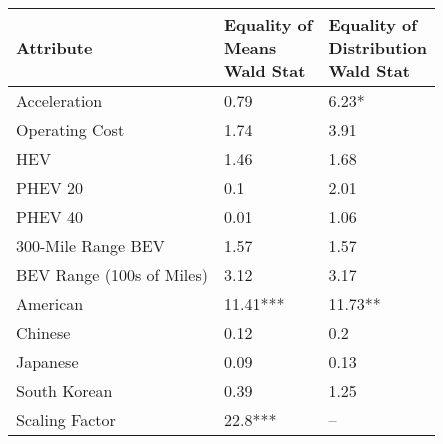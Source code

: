 \begin{tabular}{lll}
\toprule
                Attribute & \makecell{Equality of \\ Means \\ Wald Stat} & \makecell{Equality of \\ Distribution \\ Wald Stat} \\
\midrule
             Acceleration &                        \multirow{1}{*}{0.79} &                             \multirow{1}{*}{6.23*} \\
           Operating Cost &                        \multirow{1}{*}{1.74} &                              \multirow{1}{*}{3.91} \\
                      HEV &                        \multirow{1}{*}{1.46} &                              \multirow{1}{*}{1.68} \\
                  PHEV 20 &                         \multirow{1}{*}{0.1} &                              \multirow{1}{*}{2.01} \\
                  PHEV 40 &                        \multirow{1}{*}{0.01} &                              \multirow{1}{*}{1.06} \\
       300-Mile Range BEV &                        \multirow{1}{*}{1.57} &                              \multirow{1}{*}{1.57} \\
BEV Range (100s of Miles) &                        \multirow{1}{*}{3.12} &                              \multirow{1}{*}{3.17} \\
                 American &                    \multirow{1}{*}{11.41***} &                           \multirow{1}{*}{11.73**} \\
                  Chinese &                        \multirow{1}{*}{0.12} &                               \multirow{1}{*}{0.2} \\
                 Japanese &                        \multirow{1}{*}{0.09} &                              \multirow{1}{*}{0.13} \\
             South Korean &                        \multirow{1}{*}{0.39} &                              \multirow{1}{*}{1.25} \\
           Scaling Factor &                     \multirow{1}{*}{22.8***} &                                                 -- \\
\bottomrule
\end{tabular}
